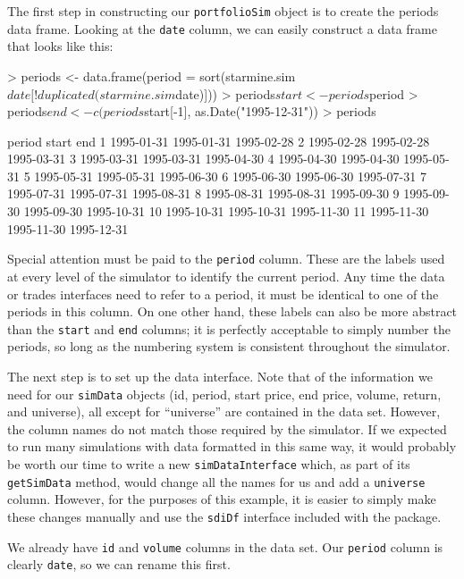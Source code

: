 \documentclass{article}
\begin{document}
The first step in constructing our \texttt{portfolioSim} object is to
create the periods data frame.  Looking at the \texttt{date} column,
we can easily construct a data frame that looks like this:

\begin{Schunk}
\begin{Sinput}
> periods <- data.frame(period = sort(starmine.sim$date[!duplicated(starmine.sim$date)]))
> periods$start <- periods$period
> periods$end <- c(periods$start[-1], as.Date("1995-12-31"))
> periods
\end{Sinput}
\begin{Soutput}
       period      start        end
1  1995-01-31 1995-01-31 1995-02-28
2  1995-02-28 1995-02-28 1995-03-31
3  1995-03-31 1995-03-31 1995-04-30
4  1995-04-30 1995-04-30 1995-05-31
5  1995-05-31 1995-05-31 1995-06-30
6  1995-06-30 1995-06-30 1995-07-31
7  1995-07-31 1995-07-31 1995-08-31
8  1995-08-31 1995-08-31 1995-09-30
9  1995-09-30 1995-09-30 1995-10-31
10 1995-10-31 1995-10-31 1995-11-30
11 1995-11-30 1995-11-30 1995-12-31
\end{Soutput}
\end{Schunk}

Special attention must be paid to the \texttt{period} column.  These
are the labels used at every level of the simulator to identify the
current period.  Any time the data or trades interfaces need to refer
to a period, it must be identical to one of the periods in this
column.  On one other hand, these labels can also be more abstract
than the \texttt{start} and \texttt{end} columns; it is perfectly
acceptable to simply number the periods, so long as the numbering
system is consistent throughout the simulator.

The next step is to set up the data interface.  Note that of the
information we need for our \texttt{simData} objects (id, period,
start price, end price, volume, return, and universe), all except for
``universe'' are contained in the data set.  However, the column names
do not match those required by the simulator.  If we expected to run
many simulations with data formatted in this same way, it would
probably be worth our time to write a new \texttt{simDataInterface}
which, as part of its \texttt{getSimData} method, would change all the
names for us and add a \texttt{universe} column.  However, for the
purposes of this example, it is easier to simply make these changes
manually and use the \texttt{sdiDf} interface included with the
package.

We already have \texttt{id} and \texttt{volume} columns in the data
set.  Our \texttt{period} column is clearly \texttt{date}, so we can
rename this first.
\end{document}
